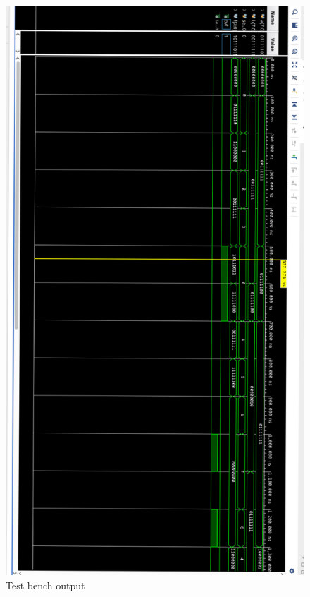 \documentclass[12pt,a4paper]{article}
\begin{document}
\begin{figure}[h]
	\centering
	\includegraphics[width=\linewidth]{image}
	\caption{Test bench output}
\end{figure}
\end{document}
